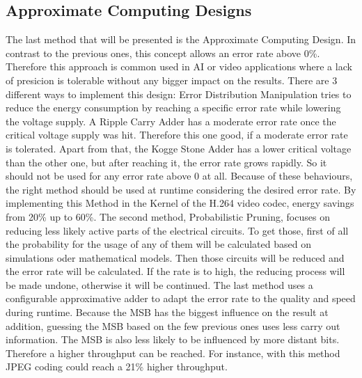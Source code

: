 \documentclass[12pt, a4paper]{article}
\begin{document}
	\subsection{Approximate Computing Designs}
	The last method that will be presented is the Approximate Computing Design. In contrast to the previous ones, this concept allows an error rate above 0\%. Therefore this approach is common used in AI or video applications where a lack of presicion is tolerable without any bigger impact on the results. There are 3 different ways to implement this design:\cite{chinese} 
	\newline
	Error Distribution Manipulation tries to reduce the energy consumption by reaching a specific error rate while lowering the voltage supply. A Ripple Carry Adder has a moderate error rate once the critical voltage supply was hit. Therefore this one good, if a moderate error rate is tolerated. 
	Apart from that, the Kogge Stone Adder has a lower critical voltage than the other one, but after reaching it, the error rate grows rapidly. So it should not be used for any error rate above 0 at all. 
	Because of these behaviours, the right method should be used at runtime considering the desired error rate.	By implementing this Method in the Kernel of the H.264 video codec, energy savings from 20\% up to 60\%.\cite{chinese}
	\newline
	The second method, Probabilistic Pruning, focuses on reducing less likely active parts of the electrical circuits. To get those, first of all the probability for the usage of any of them will be calculated based on simulations oder mathematical models. Then those circuits will be reduced and the error rate will be calculated. If the rate is to high, the reducing process will be made undone, otherwise it will be continued.
	\newline
	The last method uses a configurable approximative adder to adapt the error rate to the quality and speed during runtime. Because the MSB has the biggest influence on the result at addition, guessing the MSB based on the few previous ones uses less carry out information. The MSB is also less likely to be influenced by more distant bits. Therefore a higher throughput can be reached. For instance, with this method JPEG coding could reach a 21\% higher throughput.\cite{chinese}
	\newline
\end{document}
